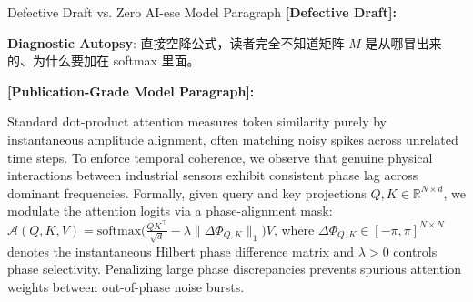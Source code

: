 \begin{ExampleBox}{Defective Draft vs. Zero AI-ese Model Paragraph}
\textbf{\color{TargetHighlight}[Defective Draft]:}\par
{}\par\vspace{4pt}
\textbf{Diagnostic Autopsy}: 直接空降公式，读者完全不知道矩阵 $M$ 是从哪冒出来的、为什么要加在 softmax 里面。\par\vspace{6pt}
\textbf{\color{AcadNavy}[Publication-Grade Model Paragraph]:}\par
Standard dot-product attention measures token similarity purely by instantaneous amplitude alignment, often matching noisy spikes across unrelated time steps. To enforce temporal coherence, we observe that genuine physical interactions between industrial sensors exhibit consistent phase lag across dominant frequencies. Formally, given query and key projections $Q, K \in \mathbb{R}^{N \times d}$, we modulate the attention logits via a phase-alignment mask: $\mathcal{A}(Q, K, V) = \text{softmax}\big(\frac{QK^\top}{\sqrt{d}} - \lambda \|\Delta \Phi_{Q,K}\|_1\big)V$, where $\Delta \Phi_{Q,K} \in [-\pi, \pi]^{N \times N}$ denotes the instantaneous Hilbert phase difference matrix and $\lambda > 0$ controls phase selectivity. Penalizing large phase discrepancies prevents spurious attention weights between out-of-phase noise bursts.
\end{ExampleBox}

